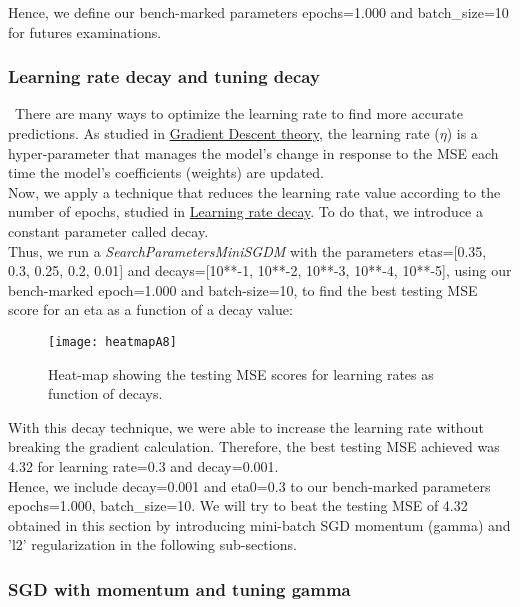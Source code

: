 Hence, we define our bench-marked parameters epochs=1.000 and batch\_size=10 for futures examinations.

\subsubsection{Learning rate decay and tuning decay}
\label{chap:Learning rate decay and tuning decay}

\qquad \, There are many ways to optimize the learning rate to find more accurate predictions. As studied in \hyperref[chap:Gradient Decedent]{Gradient Descent theory}, the learning rate ($\eta$) is a hyper-parameter that manages the model's change in response to the MSE each time the model's coefficients (weights) are updated.\\

Now, we apply a technique that reduces the learning rate value according to the number of epochs, studied in \hyperref[chap:Learning Rate with decay]{Learning rate decay}. To do that, we introduce a constant parameter called decay.\\

Thus, we run a \textit{SearchParametersMiniSGDM} with the parameters etas=[0.35, 0.3, 0.25, 0.2, 0.01] and decays=[10**-1, 10**-2, 10**-3, 10**-4, 10**-5], using our bench-marked epoch=1.000 and batch-size=10, to find the best testing MSE score for an eta as a function of a decay value:

\begin{figure}[H]
\label{fig:figA7}
\centering
\texttt{[image: heatmapA8]}
\caption{Heat-map showing the testing MSE scores for learning rates as function of decays.}
\end{figure}

With this decay technique, we were able to increase the learning rate without breaking the gradient calculation. Therefore, the best testing MSE achieved was 4.32 for learning rate=0.3 and decay=0.001.\\

Hence, we include decay=0.001 and eta0=0.3 to our bench-marked parameters epochs=1.000, batch\_size=10. We will try to beat the testing MSE of 4.32 obtained in this section by introducing mini-batch SGD momentum (gamma) and 'l2' regularization in the following sub-sections.

\subsubsection{SGD with momentum and tuning gamma}
\label{chap:SGD with momentum and tuning gamma}

